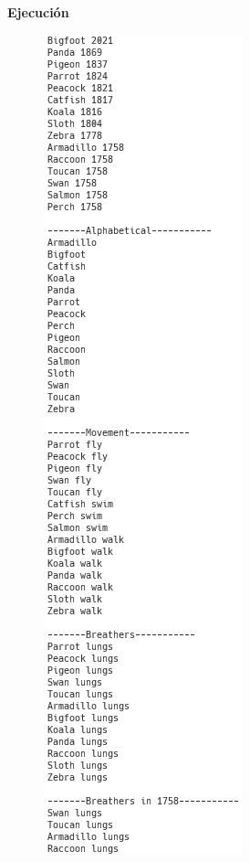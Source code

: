 \documentclass[11pt, twocolumn]{article}
\begin{document}
  \newpage
  \textbf{Ejecución}
  \begin{figure}[h!]
    \includegraphics[width = 0.58\columnwidth, center]{lab.png}
  \end{figure}
\end{document}
